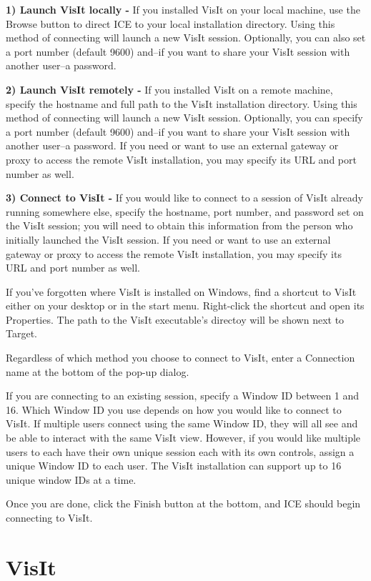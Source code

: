 \documentclass{article}
\begin{document}
\textbf{1) Launch VisIt locally -} If you installed VisIt on your local machine,
use the Browse button to direct ICE to your local installation directory. Using this
method of connecting will launch a new VisIt session. Optionally, you can also
set a port number (default 9600) and--if you want to share your VisIt session
with another user--a password.

\textbf{2) Launch VisIt remotely -} If you installed VisIt on a remote machine,
specify the hostname and full path to the VisIt installation directory. Using this
method of connecting will launch a new VisIt session. Optionally, you can
specify a port number (default 9600) and--if you want to share your VisIt
session with another user--a password. If you need or want to use an external
gateway or proxy to access the remote VisIt installation, you may specify its
URL and port number as well.

\textbf{3) Connect to VisIt -} If you would like to connect to a session of VisIt
already running somewhere else, specify the hostname, port number, and password set on
the VisIt session; you will need to obtain this information from the person who
initially launched the VisIt session. If you need or want to use an external
gateway or proxy to access the remote VisIt installation, you may specify its
URL and port number as well.

If you've forgotten where VisIt is installed on Windows, find a shortcut to
VisIt either on your desktop or in the start menu. Right-click the shortcut and
open its Properties. The path to the VisIt executable's directoy will be shown
next to Target.

Regardless of which method you choose to connect to VisIt, enter a Connection
name at the bottom of the pop-up dialog. 

If you are connecting to an existing session, specify a Window ID between 1 and
16. Which Window ID you use depends on how you would like to connect to VisIt.
If multiple users connect using the same Window ID, they will all see and be
able to interact with the same VisIt view. However, if you would like multiple
users to each have their own unique session each with its own controls, assign a
unique Window ID to each user. The VisIt installation can support up to 16
unique window IDs at a time.

Once you are done, click the Finish button at the bottom, and ICE should begin
connecting to VisIt.

\section{VisIt}
\end{document}
